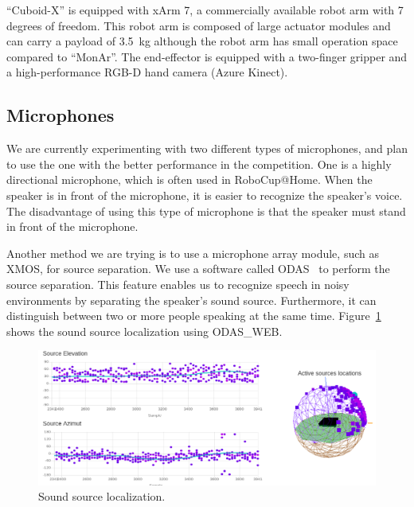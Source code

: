 \documentclass[runningheads,a4paper]{llncs}
\begin{document}
``Cuboid-X'' is equipped with xArm 7, a commercially available robot arm with 7 degrees of freedom. This robot arm is composed of large actuator modules and can carry a payload of 3.5~kg although the robot arm has small operation space compared to ``MonAr''. The end-effector is equipped with a two-finger gripper and a high-performance RGB-D hand camera (Azure Kinect).


\subsection{Microphones}
We are currently experimenting with two different types of microphones, and plan to use the one with the better performance in the competition.
One is a highly directional microphone, which is often used in RoboCup@Home.
When the speaker is in front of the microphone, it is easier to recognize the speaker's voice. The disadvantage of using this type of microphone is that the speaker must stand in front of the microphone.

Another method we are trying is to use a microphone array module, such as XMOS, for source separation.
We use a software called ODAS~\cite{Grondin201963} to perform the source separation.
This feature enables us to recognize speech in noisy environments by separating the speaker's sound source. Furthermore, it can distinguish between two or more people speaking at the same time. Figure~\ref{fig:odas} shows the sound source localization using ODAS\_WEB.
\begin{figure}[tbp]
    \centering
    \includegraphics[width=0.6\linewidth]{images/odas_web_side.png}
    \caption{Sound source localization.}
    \label{fig:odas}
\end{figure}
\end{document}
